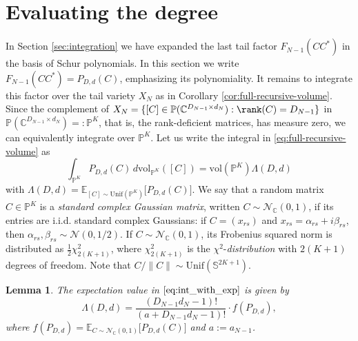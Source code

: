 \documentclass{article}
\newtheorem{lemma}[theorem]{Lemma}
\theoremstyle{definition}
\newcommand{\C}{\mathbb{C}}
\newcommand{\vol}{\mathrm{vol}}
\renewcommand{\P}{\mathbb{P}}
\begin{document}
\section{Evaluating the degree}\label{sec:degree}
In Section \ref{sec:integration} we have expanded the last tail factor $F_{N-1}(CC^*)$ in the basis of Schur polynomials. In this section we write $F_{N-1}(CC^*)=P_{D,d}(C)$, emphasizing its polynomiality. It remains to integrate this factor over the tail variety $X_N$ as in Corollary \ref{cor:full-recursive-volume}.
Since the complement of $X_N = \{[C] \in \P(\C^{D_{N-1}\times d_N}):\rank(C) = D_{N-1}\}$ in $\P(\C^{D_{N-1}\times d_N}) =: \P^K$, that is, the rank-deficient matrices, has measure zero, we can equivalently integrate over $\P^K$.
Let us write the integral in \eqref{eq:full-recursive-volume} as
\begin{equation}\label{eq:int_with_exp}
\int_{\P^K}P_{D,d}(C)\,d\vol_{\P^K}([C]) = \vol(\P^K) \Lambda(D, d) 
\end{equation}
with $\Lambda(D, d) = \mathbb{E}_{[C] \sim \mathrm{Unif}(\P^K)}\Big[P_{D,d}(C)\Big]$. We say that a random matrix $C \in \P^K$ is a \emph{standard complex Gaussian matrix}, written $C \sim \mathcal N_{\C}(0,1)$, if its entries are i.i.d. standard complex Gaussians: if $C=(x_{rs})$ and $x_{rs}=\alpha_{rs}+i\beta_{rs}$, then $\alpha_{rs}, \beta_{rs}\sim \mathcal N(0,1/2)$. If $C \sim \mathcal N_{\C}(0,1)$, its Frobenius squared norm is distributed as $\frac{1}{2}\chi^2_{2(K+1)}$, where $\chi^2_{2(K+1)}$ is the $\chi^2$-\emph{distribution} with $2(K+1)$ degrees of freedom. Note that $C/\|C\| \sim \mathrm{Unif}(\mathbb S^{2K+1})$.  
\begin{lemma}\label{lemma:lambda_D}
    The expectation value in $\eqref{eq:int_with_exp}$ is given by
\begin{equation*}
    \Lambda(D, d) = \frac{(D_{N-1}d_N -1)!}{(a + D_{N-1}d_N-1)!}\cdot f(P_{D,d}),
\end{equation*}
where $f(P_{D,d})=\mathbb{E}_{C \sim \mathcal N_{\C}(0,1)}\Big[P_{D,d}(C)\Big]$ and $a:= a_{N-1}$.
\end{lemma}
\end{document}
